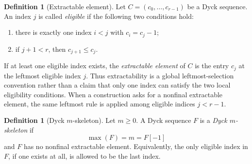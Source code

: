 \documentclass[11pt]{article}
\theoremstyle{plain}
\theoremstyle{definition}
\newtheorem{definition}[theorem]{Definition}
\theoremstyle{remark}
\begin{document}
\begin{definition}[Extractable element]
\label{def:extractable-element}
Let \(C=(c_0,\ldots,c_{r-1})\) be a Dyck sequence.  An index \(j\) is called
\emph{eligible} if the following two conditions hold:
\begin{enumerate}[label=(\roman*)]
  \item there is exactly one index \(i<j\) with \(c_i=c_j-1\);
  \item if \(j+1<r\), then \(c_{j+1}\le c_j\).
\end{enumerate}
If at least one eligible index exists, the \emph{extractable element} of
\(C\) is the entry \(c_j\) at the leftmost eligible index \(j\).  Thus
extractability is a global leftmost-selection convention rather than a claim
that only one index can satisfy the two local eligibility conditions.  When a
construction asks for a nonfinal extractable element, the same leftmost rule is
applied among eligible indices \(j<r-1\).
\end{definition}
\begin{definition}[Dyck \(m\)-skeleton]
\label{def:dyck-m-skeleton}
Let \(m\ge 0\).  A Dyck sequence \(F\) is a \emph{Dyck \(m\)-skeleton} if
\[
  \max(F)=m=F[-1]
\]
and \(F\) has no nonfinal extractable element.  Equivalently, the only
eligible index in \(F\), if one exists at all, is allowed to be the last index.
\end{definition}
\end{document}
